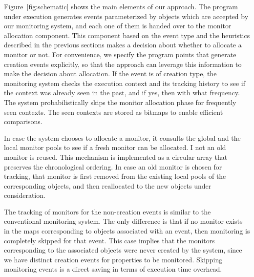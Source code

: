 Figure~\ref{fig:schematic} shows the main elements of our approach. The program 
under execution generates events parameterized by objects which are accepted by 
our monitoring system, and each one of them is handed over to the monitor 
allocation component. This component based on the event type and the heuristics 
described in the previous sections
makes a decision about whether to allocate a monitor or not. For convenience, we 
specify the program points that generate creation events explicitly, so that the 
approach can leverage this information to make the decision about allocation. 
If the event is of creation type, the monitoring system checks the execution context and its 
tracking history to see if the context was already seen in the past, and if yes, 
then with what frequency. The system probabilistically skips the monitor 
allocation phase for frequently seen contexts. 
The seen contexts are stored as bitmaps to enable efficient
comparisons.

In case the system chooses to allocate a monitor, it consults the global and the 
local monitor pools to see if a fresh monitor can be allocated. I not
an old monitor is reused. This mechanism is implemented as a circular array that preserves 
the chronological ordering. In case an old monitor is chosen for tracking, that 
monitor is first removed from the existing local pools of the corresponding 
objects, and then reallocated to the new objects under consideration.

The tracking of monitors for the non-creation events is similar to the 
conventional monitoring system. The only difference is that if no monitor exists in the maps 
corresponding to objects associated with an event, then monitoring is completely 
skipped for that event. This case implies that the monitors corresponding to the 
associated objects were never created by the system, since we have distinct creation
events for properties to be monitored. Skipping monitoring events is a 
direct saving in terms of execution time overhead.




